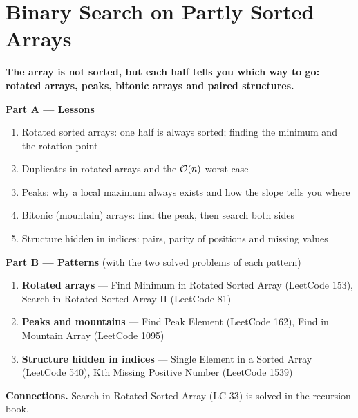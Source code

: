 \chapter{Binary Search on Partly Sorted Arrays}
\label{ch:sorted_arrays}

\begin{tcolorbox}[enhanced, colback=white, colframe=secondaryblue, boxrule=1pt, arc=2mm]
\textbf{\large\textcolor{primaryblue}{The array is not sorted, but each half tells you which way to go: rotated arrays, peaks, bitonic arrays and paired structures.}}
\end{tcolorbox}


\begin{plannedbox}
\textbf{Part A --- Lessons}
\begin{enumerate}[leftmargin=*, label=\textbf{A\arabic*.}, itemsep=1pt]
    \item Rotated sorted arrays: one half is always sorted; finding the minimum and the rotation point
    \item Duplicates in rotated arrays and the $\mathcal{O}(n)$ worst case
    \item Peaks: why a local maximum always exists and how the slope tells you where
    \item Bitonic (mountain) arrays: find the peak, then search both sides
    \item Structure hidden in indices: pairs, parity of positions and missing values
\end{enumerate}
\textbf{Part B --- Patterns} (with the two solved problems of each pattern)
\begin{enumerate}[leftmargin=*, label=\textbf{P\arabic*.}, itemsep=1pt]
    \item \textbf{Rotated arrays} --- Find Minimum in Rotated Sorted Array {\small\color{darkgray}(LeetCode 153)}, Search in Rotated Sorted Array II {\small\color{darkgray}(LeetCode 81)}
    \item \textbf{Peaks and mountains} --- Find Peak Element {\small\color{darkgray}(LeetCode 162)}, Find in Mountain Array {\small\color{darkgray}(LeetCode 1095)}
    \item \textbf{Structure hidden in indices} --- Single Element in a Sorted Array {\small\color{darkgray}(LeetCode 540)}, Kth Missing Positive Number {\small\color{darkgray}(LeetCode 1539)}
\end{enumerate}
\textbf{Connections.} Search in Rotated Sorted Array (LC 33) is solved in the recursion book.
\end{plannedbox}
